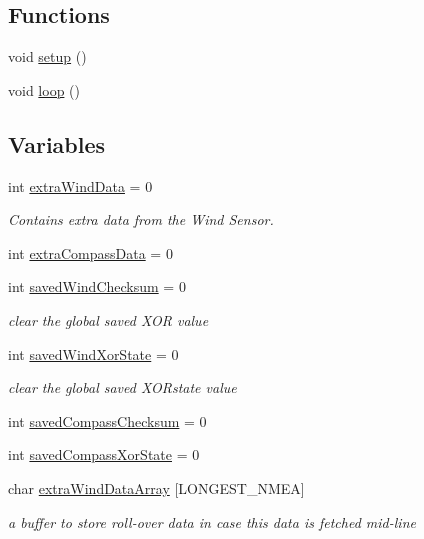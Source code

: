 \subsection*{\-Functions}
\begin{DoxyCompactItemize}
\item 
void \hyperlink{sailcode__alpha6_8pde_a4fc01d736fe50cf5b977f755b675f11d}{setup} ()
\item 
void \hyperlink{sailcode__alpha6_8pde_afe461d27b9c48d5921c00d521181f12f}{loop} ()
\end{DoxyCompactItemize}
\subsection*{\-Variables}
\begin{DoxyCompactItemize}
\item 
int \hyperlink{group__group1_gaf9d919ceea98cf74d8ee327ca87871ee}{extra\-Wind\-Data} = 0
\begin{DoxyCompactList}\small\item\em \-Contains extra data from the \-Wind \-Sensor. \end{DoxyCompactList}\item 
int \hyperlink{group__group1_gaafded9aee7842e71393cafc5ac68d921}{extra\-Compass\-Data} = 0
\item 
int \hyperlink{group__group1_gaf7ce3159cdebccf941f8db4e70f5764e}{saved\-Wind\-Checksum} = 0
\begin{DoxyCompactList}\small\item\em clear the global saved \-X\-O\-R value \end{DoxyCompactList}\item 
int \hyperlink{group__group1_gabc070e9e6f6449471852bd233593d1d2}{saved\-Wind\-Xor\-State} = 0
\begin{DoxyCompactList}\small\item\em clear the global saved \-X\-O\-Rstate value \end{DoxyCompactList}\item 
int \hyperlink{group__group1_ga6e28e651127135816788318d7b473dc8}{saved\-Compass\-Checksum} = 0
\item 
int \hyperlink{group__group1_ga766482b676879097212dc7aba1450aa0}{saved\-Compass\-Xor\-State} = 0
\item 
char \hyperlink{group__group1_ga5a0e345949d7a23900298d33d0be150c}{extra\-Wind\-Data\-Array} \mbox{[}\-L\-O\-N\-G\-E\-S\-T\-\_\-\-N\-M\-E\-A\mbox{]}
\begin{DoxyCompactList}\small\item\em a buffer to store roll-\/over data in case this data is fetched mid-\/line \end{DoxyCompactList}\item 

\end{DoxyCompactItemize}
